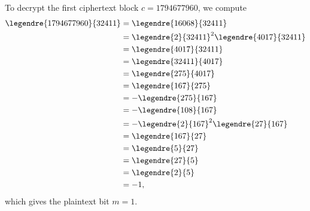 \documentclass[
  coursecode={MTHE 418},
  assignmentname={Homework \homeworknumber},
  studentnumber=20053722,
  name={Bryan Hoang},
  draft,
]{
  ltxanswer%
}
\begin{document}
  \begin{questions}
    \setcounter{question}{\questionnumber}
    \addtocounter{question}{-1}
    \question[10]\
    \begin{parts}
      \part{}
      \begin{solution}
        To decrypt the first ciphertext block \(c = 1794677960\), we compute
        \begin{align*}
          \legendre{1794677960}{32411} &= \legendre{16068}{32411}                        \\
                                       &= \legendre{2}{32411}^{2} \legendre{4017}{32411} \\
                                       &= \legendre{4017}{32411}                         \\
                                       &= \legendre{32411}{4017}                         \\
                                       &= \legendre{275}{4017}                           \\
                                       &= \legendre{167}{275}                            \\
                                       &= -\legendre{275}{167}                           \\
                                       &= -\legendre{108}{167}                           \\
                                       &= -\legendre{2}{167}^{2} \legendre{27}{167}      \\
                                       &= \legendre{167}{27}                             \\
                                       &= \legendre{5}{27}                               \\
                                       &= \legendre{27}{5}                               \\
                                       &= \legendre{2}{5}                                \\
                                       &= -1,
        \end{align*}
        which gives the plaintext bit \(m = 1\).

        \newpage


\end{solution}
\end{parts}
\end{questions}
\end{document}
